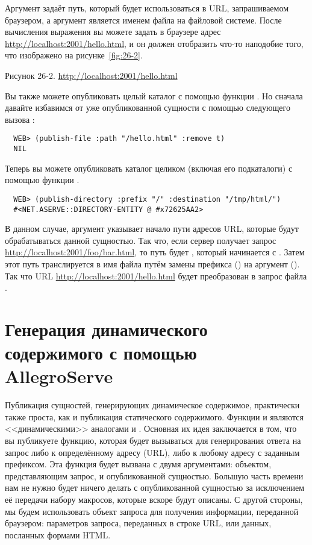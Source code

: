 Аргумент  задаёт путь, который будет использоваться в URL, запрашиваемом
браузером, а аргумент  является именем файла на файловой системе. После
вычисления выражения  вы можете задать в браузере адрес
\url{http://localhost:2001/hello.html}, и он должен отобразить что-то наподобие того, что
изображено на рисунке~\ref{fig:26-2}.

Рисунок 26-2. \url{http://localhost:2001/hello.html}

Вы также можете опубликовать целый каталог с помощью функции . Но
сначала давайте избавимся от уже опубликованной сущности с помощью следующего вызова
:

\begin{lstlisting}
  WEB> (publish-file :path "/hello.html" :remove t)
  NIL
\end{lstlisting}

Теперь вы можете опубликовать каталог  целиком (включая его подкаталоги)
с помощью функции .

\begin{lstlisting}
  WEB> (publish-directory :prefix "/" :destination "/tmp/html/")
  #<NET.ASERVE::DIRECTORY-ENTITY @ #x72625AA2>
\end{lstlisting}

В данном случае, аргумент  указывает начало пути адресов URL, которые будут
обрабатываться данной сущностью. Так что, если сервер получает запрос
\url{http://localhost:2001/foo/bar.html}, то путь будет , который
начинается с \code{/}. Затем этот путь транслируется в имя файла путём замены префикса
(\code{/}) на аргумент  (). Так что URL
\url{http://localhost:2001/hello.html} будет преобразован в запрос файла
.

\section{Генерация динамического содержимого с помощью AllegroServe}

Публикация сущностей, генерирующих динамическое содержимое, практически также проста, как
и публикация статического содержимого. Функции  и 
являются <<динамическими>> аналогами  и
. Основная их идея заключается в том, что вы публикуете функцию,
которая будет вызываться для генерирования ответа на запрос либо к определённому адресу
(URL), либо к любому адресу с заданным префиксом. Эта функция будет вызвана с двумя
аргументами: объектом, представляющим запрос, и опубликованной сущностью. Большую часть
времени нам не нужно будет ничего делать с опубликованной сущностью за исключением её
передачи набору макросов, которые вскоре будут описаны. С другой стороны, мы будем
использовать объект запроса для получения информации, переданной браузером: параметров
запроса, переданных в строке URL, или данных, посланных формами HTML.

